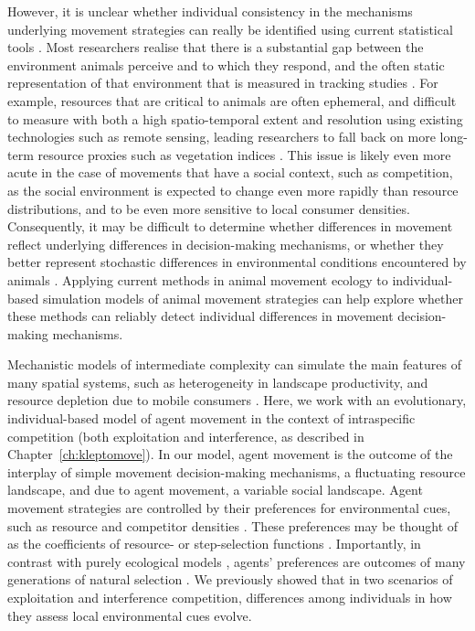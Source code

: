 However, it is unclear whether individual consistency in the mechanisms underlying movement strategies can really be identified using current statistical tools \parencite{stuber2022,spiegel2022}.
Most researchers realise that there is a substantial gap between the environment animals perceive and to which they respond, and the often static representation of that environment that is measured in tracking studies \parencite{spiegel2022}.
For example, resources that are critical to animals are often ephemeral, and difficult to measure with both a high spatio-temporal extent and resolution using existing technologies such as remote sensing, leading researchers to fall back on more long-term resource proxies such as vegetation indices \citep{pettorelli2011}.
This issue is likely even more acute in the case of movements that have a social context, such as competition, as the social environment is expected to change even more rapidly than resource distributions, and to be even more sensitive to local consumer densities.
Consequently, it may be difficult to determine whether differences in movement reflect underlying differences in decision-making mechanisms, or whether they better represent stochastic differences in environmental conditions encountered by animals \parencite{spiegel2022}.
Applying current methods in animal movement ecology to individual-based simulation models of animal movement strategies \citep[see e.g.][]{getz2015,getz2016,netz2021} can help explore whether these methods can reliably detect individual differences in movement decision-making mechanisms.

Mechanistic models of intermediate complexity can simulate the main features of many spatial systems, such as heterogeneity in landscape productivity, and resource depletion due to mobile consumers \citep{getz2015,white2018,deangelis2019,netz2021,diaz2021}.
Here, we work with an evolutionary, individual-based model of agent movement in the context of intraspecific competition (both exploitation and interference, as described in Chapter~\ref{ch:kleptomove}).
In our model, agent movement is the outcome of the interplay of simple movement decision-making mechanisms, a fluctuating resource landscape, and due to agent movement, a variable social landscape.
Agent movement strategies are controlled by their preferences for environmental cues, such as resource and competitor densities \citep[see e.g.][]{getz2015,white2018,netz2021}.
These preferences may be thought of as the coefficients of resource- or step-selection functions \citep[][]{white2018}.
Importantly, in contrast with purely ecological models \citep[e.g.][]{white2018}, agents' preferences are outcomes of many generations of natural selection \citep[see also][]{getz2015,netz2021}.
We previously showed that in two scenarios of exploitation and interference competition, differences among individuals in how they assess local environmental cues evolve.

